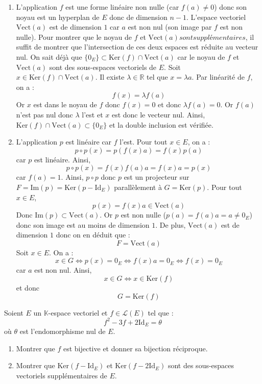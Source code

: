 \documentclass[a4paper,10pt]{report}
\begin{document}
\begin{enumerate}
\item L'application $f$ est une forme linéaire non nulle (car $f(a) \neq 0$) donc son noyau est un hyperplan de $E$ donc de dimension $n-1$. L'espace vectoriel $\textrm{Vect}(a)$ est de dimension $1$ car $a$ est non nul (son image par $f$ est non nulle). Pour montrer que le noyau de $f$ et $\textrm{Vect}(a) sont supplémentaires$, il suffit de montrer que l'intersection de ces deux espaces est réduite au vecteur nul. On sait déjà que $\lbrace 0_E \rbrace \subset \textrm{Ker}(f) \cap \textrm{Vect}(a)$ car le noyau de $f$ et $\textrm{Vect}(a)$ sont des sous-espaces vectoriels de $E$. Soit $x \in \textrm{Ker}(f) \cap \textrm{Vect}(a)$. Il existe $\lambda \in \mathbb{R}$ tel que $x= \lambda a$. Par linéarité de $f$, on a :
$$ f(x) = \lambda f(a)$$
Or $x$ est dans le noyau de $f$ donc $f(x) = 0$ et donc $\lambda f(a) = 0$. Or $f(a)$ n'est pas nul donc $\lambda$ l'est et $x$ est donc le vecteur nul. Ainsi, $\textrm{Ker}(f) \cap \textrm{Vect}(a) \subset \lbrace 0_E \rbrace$ et la double inclusion est vérifiée.
\item L'application $p$ est linéaire car $f$ l'est. Pour tout $x \in E$, on a :
$$ p \circ p (x) = p(f(x) a) = f(x) p(a)$$
car $p$ est linéaire. Ainsi,
$$ p \circ p (x) = f(x) f(a) a = f(x) a = p(x)$$
car $f(a)=1$. Ainsi, $p \circ p$ donc $p$ est un projecteur sur $F= \textrm{Im}(p)= \textrm{Ker}(p- \textrm{Id}_E)$ parallèlement à $G = \textrm{Ker}(p)$. Pour tout $x \in E$,
$$ p(x) = f(x) a \in \textrm{Vect}(a)$$
Donc $\textrm{Im}(p) \subset \textrm{Vect}(a)$. Or $p$ est non nulle ($p(a)=f(a) a= a \neq 0_E$) donc son image est au moins de dimension $1$. De plus, $\textrm{Vect}(a)$ est de dimension $1$ donc on en déduit que :
$$ F = \textrm{Vect}(a)$$
Soit $x \in E$. On a :
$$ x \in G \Longleftrightarrow p(x) = 0_E \Longleftrightarrow f(x) a = 0_E \Longleftrightarrow f(x) = 0_E$$
car $a$ est non nul. Ainsi,
$$ x \in G \Longleftrightarrow x \in \textrm{Ker}(f)$$
et donc 
$$ G = \textrm{Ker}(f)$$
\end{enumerate}

\begin{Exercice}{} Soient $E$ un $\mathbb{K}$-espace vectoriel et $f \in \mathcal{L}(E)$ tel que :
    \[
    f^2 - 3f + 2 \textrm{Id}_E = \theta
    \]
où $\theta$ est l'endomorphisme nul de $E$.
    \begin{enumerate}
      \item Montrer que $f$ est bijective et donner sa bijection réciproque.
      \item Montrer que $\textrm{Ker}(f - \textrm{Id}_E)$ et $\textrm{Ker}(f - 2\textrm{Id}_E)$ sont des sous-espaces vectoriels supplémentaires de $E$.
    \end{enumerate}
\end{Exercice}
\end{document}
